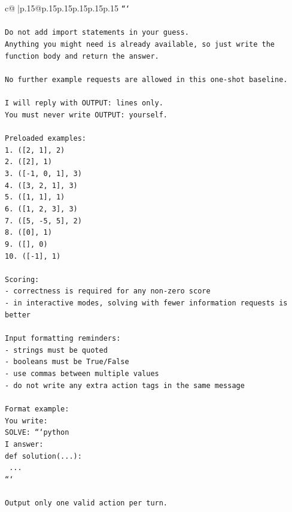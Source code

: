 \documentclass{article}
\begin{document}
{\begin{supertabular}{c@{$\;$}|p{.15\linewidth}@{}p{.15\linewidth}p{.15\linewidth}p{.15\linewidth}p{.15\linewidth}p{.15\linewidth}}
{{{\texttt{```} \\
\\ 
\texttt{Do not add import statements in your guess.} \\
\texttt{Anything you might need is already available, so just write the function body and return the answer.} \\
\\ 
\texttt{No further example requests are allowed in this one{-}shot baseline.} \\
\\ 
\texttt{I will reply with OUTPUT: lines only.} \\
\texttt{You must never write OUTPUT: yourself.} \\
\\ 
\texttt{Preloaded examples:} \\
\texttt{1. ({[}2, 1{]}, 2)} \\
\texttt{2. ({[}2{]}, 1)} \\
\texttt{3. ({[}{-}1, 0, 1{]}, 3)} \\
\texttt{4. ({[}3, 2, 1{]}, 3)} \\
\texttt{5. ({[}1, 1{]}, 1)} \\
\texttt{6. ({[}1, 2, 3{]}, 3)} \\
\texttt{7. ({[}5, {-}5, 5{]}, 2)} \\
\texttt{8. ({[}0{]}, 1)} \\
\texttt{9. ({[}{]}, 0)} \\
\texttt{10. ({[}{-}1{]}, 1)} \\
\\ 
\texttt{Scoring:} \\
\texttt{{-} correctness is required for any non{-}zero score} \\
\texttt{{-} in interactive modes, solving with fewer information requests is better} \\
\\ 
\texttt{Input formatting reminders:} \\
\texttt{{-} strings must be quoted} \\
\texttt{{-} booleans must be True/False} \\
\texttt{{-} use commas between multiple values} \\
\texttt{{-} do not write any extra action tags in the same message} \\
\\ 
\texttt{Format example:} \\
\texttt{You write:} \\
\texttt{SOLVE: ```python} \\
\texttt{I answer:} \\
\texttt{def solution(...):} \\
\texttt{    ...} \\
\texttt{```} \\
\\ 
\texttt{Output only one valid action per turn.} \\
            }
        }
    }
     \\ \\


\end{supertabular}}
\end{document}
